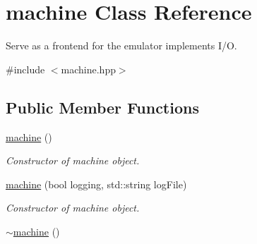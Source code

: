 \hypertarget{classmachine}{}\section{machine Class Reference}
\label{classmachine}


Serve as a frontend for the emulator implements I/O.  




{\ttfamily \#include $<$machine.\+hpp$>$}

\subsection*{Public Member Functions}
\begin{DoxyCompactItemize}
\item 
\hyperlink{classmachine_aeeec630a2d822024410a93836835e305}{machine} ()\hypertarget{classmachine_aeeec630a2d822024410a93836835e305}{}\label{classmachine_aeeec630a2d822024410a93836835e305}

\begin{DoxyCompactList}\small\item\em Constructor of machine object. \end{DoxyCompactList}\item 
\hyperlink{classmachine_a128a1ae7e488b0f02073379bc7502913}{machine} (bool logging, std\+::string log\+File)
\begin{DoxyCompactList}\small\item\em Constructor of machine object. \end{DoxyCompactList}\item 
\hyperlink{classmachine_a0e7c71cf31b616c8017ad968edd61414}{$\sim$machine} ()\hypertarget{classmachine_a0e7c71cf31b616c8017ad968edd61414}{}\label{classmachine_a0e7c71cf31b616c8017ad968edd61414}


\end{DoxyCompactItemize}
